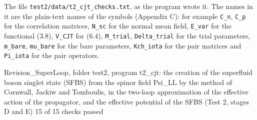 \documentclass[
  10pt,
]{article}
\newenvironment{Shaded}{}{}
\newcommand{\NormalTok}[1]{#1}
\begin{document}
The file \texttt{test2/data/t2\_cjt\_checks.txt}, as the program wrote
it. The names in it are the plain-text names of the symbols (Appendix
C): for example \texttt{C\_n}, \texttt{C\_p} for the correlation
matrices, \texttt{N\_sc} for the normal mean field, \texttt{E\_var} for
the functional (3.8), \texttt{V\_CJT} for (6.4), \texttt{M\_trial},
\texttt{Delta\_trial} for the trial parameters, \texttt{m\_bare},
\texttt{mu\_bare} for the bare parameters, \texttt{Kch\_iota} for the
pair matrices and \texttt{Pi\_iota} for the pair operators.

\begin{Shaded}
\begin{Highlighting}[]
\NormalTok{Revision\_SuperLoop, folder test2, program \textasciigrave{}t2\_cjt\textasciigrave{}: the creation of the superfluid boson singlet state (SFBS) from the spinor field Psi\_LL by the method of Cornwall, Jackiw and Tomboulis, in the two{-}loop approximation of the effective action of the propagator, and the effective potential of the SFBS (Test 2, stages D and E)}
\NormalTok{15 of 15 checks passed}


\end{Highlighting}
\end{Shaded}
\end{document}
